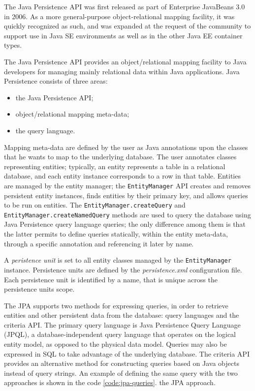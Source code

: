 \newparagraph The Java Persistence API \cite{book:projpa2} was first released as part of Enterprise JavaBeans 3.0 in 2006. As a more general-purpose object-relational mapping facility, it was quickly recognized as such, and was expanded at the request of the community to support use in Java SE environments as well as in the other Java EE container types.

\noindent The Java Persistence API provides an object/relational mapping facility to Java developers for managing mainly relational data within Java applications. Java Persistence consists of three areas:
\begin{itemize}
\item the Java Persistence API;
\item object/relational mapping meta-data;
\item the query language.
\end{itemize}

\noindent Mapping meta-data are defined by the user as Java annotations upon the classes that he wants to map to the underlying database.
The user annotates classes representing entities; typically, an entity represents a table in a relational database, and each entity instance corresponds to a row in that table. Entities are managed by the entity manager; the \texttt{EntityManager} API creates and removes persistent entity instances, finds entities by their primary key, and allows queries to be run on entities. 
The \texttt{EntityManager.createQuery} and \texttt{EntityManager.createNamedQuery} methods are used to query the database using Java Persistence query language queries; the only difference among them is that the latter permits to define queries statically, within the entity meta-data, through a specific annotation and referencing it later by name.

\noindent A \textit{peristence unit} is set to all entity classes managed by the \texttt{EntityManager} instance.
Persistence units are defined by the \textit{persistence.xml} configuration file. Each persistence unit is identified by a name, that is unique across the persistence units scope. 

\newparagraph The JPA supports two methods for expressing queries, in order to retrieve entities and other persistent data from the database: query languages and the criteria API. The primary query language is Java Persistence Query Language (JPQL), a database-independent query language that operates on the logical entity model, as opposed to the physical data model. Queries may also be expressed in SQL to take advantage of the underlying database. The criteria API provides an alternative method for constructing queries based on Java objects instead of query strings.
An example of defining the same query with the two approaches is shown in the code \ref{code:jpa-queries}.
the JPA approach.

